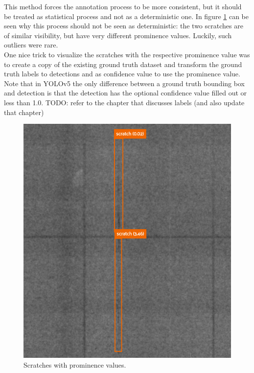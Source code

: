 This method forces the annotation process to be more consistent, but it should be treated as statistical process and not as a deterministic one. In figure \ref{fig:prom_ex} can be seen why this process should not be seen as deterministic: the two scratches are of similar visibility, but have very different prominence values. Luckily, such outliers were rare. \\
One nice trick to visualize the scratches with the respective prominence value was to create a copy of the existing ground truth dataset and transform the ground truth labels to detections and as confidence value to use the prominence value. Note that in YOLOv5 the only difference between a ground truth bounding box and detection is that the detection has the optional confidence value filled out or less than 1.0. TODO: refer to the chapter that discusses labels (and also update that chapter) \\

\begin{figure}[!h]
\includegraphics[width=\linewidth]{images/prominence_example}
\caption{Scratches with prominence values.}
\label{fig:prom_ex}
\end{figure}

